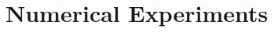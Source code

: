 \documentclass[sn-mathphys-num]{sn-jnl}%
\theoremstyle{thmstyleone}%
\theoremstyle{thmstyletwo}%
\theoremstyle{thmstylethree}%
\newcommand{\rhoapp}{\varrho_{{\rm app}}}
\begin{document}


\section{Numerical Experiments} \label{sec:num}
\end{document}

